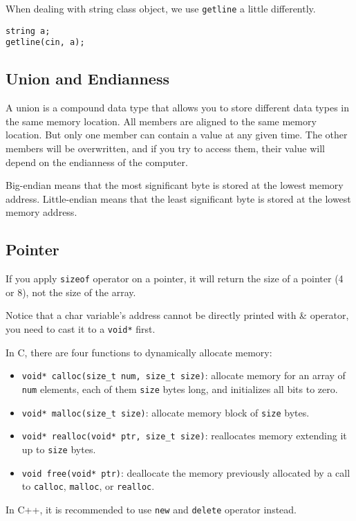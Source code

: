 \documentclass[a4paper,12pt]{article}
\begin{document}
When dealing with string class object, we use \texttt{getline} a little differently.
\begin{verbatim}
string a;
getline(cin, a);
\end{verbatim}

\subsection{Union and Endianness}

A union is a compound data type that allows you to store different data types in the same memory location.
All members are aligned to the same memory location.
But only one member can contain a value at any given time.
The other members will be overwritten, and if you try to access them, their value will depend on the endianness of the computer.

Big-endian means that the most significant byte is stored at the lowest memory address.
Little-endian means that the least significant byte is stored at the lowest memory address.

\subsection{Pointer}

If you apply \texttt{sizeof} operator on a pointer, it will return the size of a pointer (4 or 8), not the size of the array.

Notice that a char variable's address cannot be directly printed with \& operator, you need to cast it to a \texttt{void*} first.

In C, there are four functions to dynamically allocate memory: 
\begin{itemize}
	\item \texttt{void* calloc(size\_t num, size\_t size)}: allocate memory for an array of \texttt{num} elements, each of them \texttt{size} bytes long, and initializes all bits to zero.
	\item \texttt{void* malloc(size\_t size)}: allocate memory block of \texttt{size} bytes.
	\item \texttt{void* realloc(void* ptr, size\_t size)}: reallocates memory extending it up to \texttt{size} bytes.
	\item \texttt{void free(void* ptr)}: deallocate the memory previously allocated by a call to \texttt{calloc}, \texttt{malloc}, or \texttt{realloc}.
\end{itemize}

In C++, it is recommended to use \texttt{new} and \texttt{delete} operator instead.
\end{document}

